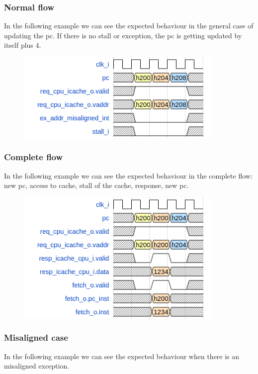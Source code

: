 \subsubsection{Normal flow}
In the following example we can see the expected behaviour in the general case of updating the pc. If there is no stall or exception, the pc is getting updated by itself plus 4.

\begin{figure}[H]
\centering
\includegraphics[width=10cm]{Figure/normal.png}
\end{figure}

\subsubsection{Complete flow}
In the following example we can see the expected behaviour in the complete flow: new pc, access to cache, stall of the cache, response, new pc.

\begin{figure}[H]
\centering
\includegraphics[width=10cm]{Figure/complete_flow.png}
\end{figure}

\subsubsection{Misaligned case}
In the following example we can see the expected behaviour when there is an misaligned exception.

